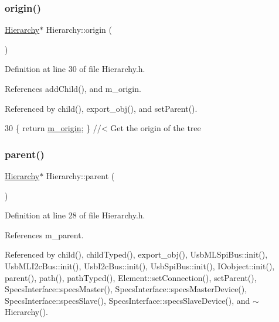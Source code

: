 \subsubsection{\texorpdfstring{origin()}{origin()}}
{\footnotesize\ttfamily \hyperlink{classHierarchy}{Hierarchy}$\ast$ Hierarchy\+::origin (\begin{DoxyParamCaption}{ }\end{DoxyParamCaption})\hspace{0.3cm}{\ttfamily [inline]}}



Definition at line 30 of file Hierarchy.\+h.



References add\+Child(), and m\+\_\+origin.



Referenced by child(), export\+\_\+obj(), and set\+Parent().


\begin{DoxyCode}
30 \{ \textcolor{keywordflow}{return} \hyperlink{classHierarchy_a16c73e557d3a7c156ffb5dc4102d148e}{m\_origin}; \}  \textcolor{comment}{//< Get the origin of the tree}
\end{DoxyCode}
\mbox{\label{classHierarchy_a1c7bec8257e717f9c1465e06ebf845fc}} 
\subsubsection{\texorpdfstring{parent()}{parent()}\hspace{0.1cm}{\footnotesize\ttfamily [1/2]}}
{\footnotesize\ttfamily \hyperlink{classHierarchy}{Hierarchy}$\ast$ Hierarchy\+::parent (\begin{DoxyParamCaption}{ }\end{DoxyParamCaption})\hspace{0.3cm}{\ttfamily [inline]}}



Definition at line 28 of file Hierarchy.\+h.



References m\+\_\+parent.



Referenced by child(), child\+Typed(), export\+\_\+obj(), Usb\+M\+L\+Spi\+Bus\+::init(), Usb\+M\+L\+I2c\+Bus\+::init(), Usb\+I2c\+Bus\+::init(), Usb\+Spi\+Bus\+::init(), I\+Oobject\+::init(), parent(), path(), path\+Typed(), Element\+::set\+Connection(), set\+Parent(), Specs\+Interface\+::specs\+Master(), Specs\+Interface\+::specs\+Master\+Device(), Specs\+Interface\+::specs\+Slave(), Specs\+Interface\+::specs\+Slave\+Device(), and $\sim$\+Hierarchy().


